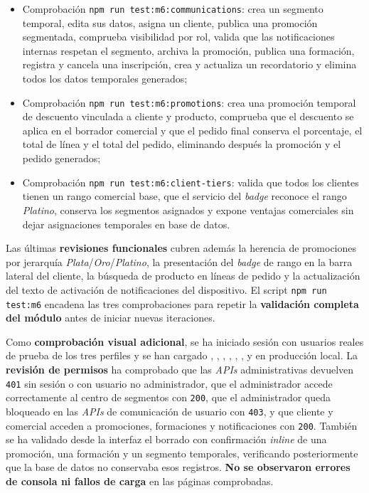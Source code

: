 \begin{itemize}
    \item Comprobación \texttt{npm run test:m6:communications}: crea un segmento temporal, edita sus datos, asigna un cliente, publica una promoción segmentada, comprueba visibilidad por rol, valida que las notificaciones internas respetan el segmento, archiva la promoción, publica una formación, registra y cancela una inscripción, crea y actualiza un recordatorio y elimina todos los datos temporales generados;
    \item Comprobación \texttt{npm run test:m6:promotions}: crea una promoción temporal de descuento vinculada a cliente y producto, comprueba que el descuento se aplica en el borrador comercial y que el pedido final conserva el porcentaje, el total de línea y el total del pedido, eliminando después la promoción y el pedido generados;
    \item Comprobación \texttt{npm run test:m6:client-tiers}: valida que todos los clientes tienen un rango comercial base, que el servicio del \textit{badge} reconoce el rango \textit{Platino}, conserva los segmentos asignados y expone ventajas comerciales sin dejar asignaciones temporales en base de datos.
\end{itemize}

Las últimas \textbf{revisiones funcionales} cubren además la herencia de promociones por jerarquía \textit{Plata}/\textit{Oro}/\textit{Platino}, la presentación del \textit{badge} de rango en la barra lateral del cliente, la búsqueda de producto en líneas de pedido y la actualización del texto de activación de notificaciones del dispositivo. El script \texttt{npm run test:m6} encadena las tres comprobaciones para repetir la \textbf{validación completa del módulo} antes de iniciar nuevas iteraciones.

Como \textbf{comprobación visual adicional}, se ha iniciado sesión con usuarios reales de prueba de los tres perfiles y se han cargado , , , , , ,  y  en producción local. La \textbf{revisión de permisos} ha comprobado que las \textit{APIs} administrativas devuelven \texttt{401} sin sesión o con usuario no administrador, que el administrador accede correctamente al centro de segmentos con \texttt{200}, que el administrador queda bloqueado en las \textit{APIs} de comunicación de usuario con \texttt{403}, y que cliente y comercial acceden a promociones, formaciones y notificaciones con \texttt{200}. También se ha validado desde la interfaz el borrado con confirmación \textit{inline} de una promoción, una formación y un segmento temporales, verificando posteriormente que la base de datos no conservaba esos registros. \textbf{No se observaron errores de consola ni fallos de carga} en las páginas comprobadas.

